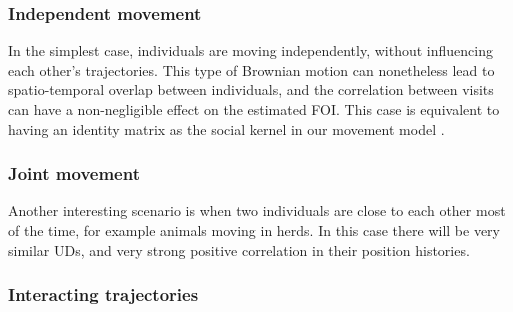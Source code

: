 \documentclass[letterpaper]{article}
\begin{document}
\subsubsection*{Independent movement}

In the simplest case, individuals are moving independently, without influencing each other's trajectories. This type of Brownian motion can nonetheless lead to spatio-temporal overlap between individuals, and the correlation between visits can have a non-negligible effect on the estimated FOI. 
This case is equivalent to having an identity matrix as the social kernel in our movement model \citep{Scharf2018}.

\subsubsection*{Joint movement}

Another interesting scenario is when two individuals are close to each other most of the time, for example animals moving in herds. In this case there will be very similar UDs, and very strong positive correlation in their position histories. 

\subsubsection*{Interacting trajectories}
 



\end{document}
